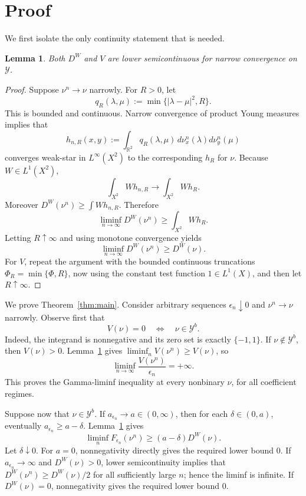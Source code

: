 \documentclass[11pt]{article}
\newtheorem{lemma}{Lemma}
\newcommand{\Y}{\mathcal{Y}}
\begin{document}
\section{Proof}

We first isolate the only continuity statement that is needed.

\begin{lemma}\label{lem:lsc}
Both \(D^W\) and \(V\) are lower semicontinuous for narrow convergence on \(\Y\).
\end{lemma}

\begin{proof}
Suppose \(\nu^n\to\nu\) narrowly. For \(R>0\), let
\[
q_R(\lambda,\mu):=\min\{|\lambda-\mu|^2,R\}.
\]
This is bounded and continuous. Narrow convergence of product Young measures \cite[Lemma~8]{BCD} implies that
\[
h_{n,R}(x,y):=\int_{\mathbb R^2}q_R(\lambda,\mu)
\,d\nu^n_x(\lambda)d\nu^n_y(\mu)
\]
converges weak-star in \(L^\infty(X^2)\) to the corresponding \(h_R\) for \(\nu\). Because \(W\in L^1(X^2)\),
\[
\int_{X^2}Wh_{n,R}\longrightarrow\int_{X^2}Wh_R.
\]
Moreover \(D^W(\nu^n)\geq\int Wh_{n,R}\). Therefore
\[
\liminf_{n\to\infty}D^W(\nu^n)\geq\int_{X^2}Wh_R.
\]
Letting \(R\uparrow\infty\) and using monotone convergence yields
\[
\liminf_{n\to\infty}D^W(\nu^n)\geq D^W(\nu).
\]
For \(V\), repeat the argument with the bounded continuous truncations
\(\Phi_R=\min\{\Phi,R\}\), now using the constant test function \(1\in L^1(X)\), and then let \(R\uparrow\infty\).
\end{proof}

We prove Theorem~\ref{thm:main}. Consider arbitrary sequences \(\epsilon_n\downarrow0\) and \(\nu^n\to\nu\) narrowly. Observe first that
\[
V(\nu)=0\quad\Longleftrightarrow\quad\nu\in\Y^b.
\]
Indeed, the integrand is nonnegative and its zero set is exactly \(\{-1,1\}\). If \(\nu\notin\Y^b\), then \(V(\nu)>0\). Lemma~\ref{lem:lsc} gives \(\liminf_nV(\nu^n)\geq V(\nu)\), so
\[
\liminf_{n\to\infty}\frac{V(\nu^n)}{\epsilon_n}=+\infty.
\]
This proves the Gamma-liminf inequality at every nonbinary \(\nu\), for all coefficient regimes.

Suppose now that \(\nu\in\Y^b\). If \(a_{\epsilon_n}\to a\in(0,\infty)\), then for each \(\delta\in(0,a)\), eventually \(a_{\epsilon_n}\geq a-\delta\). Lemma~\ref{lem:lsc} gives
\[
\liminf_nF_{\epsilon_n}(\nu^n)
\geq(a-\delta)D^W(\nu).
\]
Let \(\delta\downarrow0\). For \(a=0\), nonnegativity directly gives the required lower bound \(0\). If \(a_{\epsilon_n}\to\infty\) and \(D^W(\nu)>0\), lower semicontinuity implies that \(D^W(\nu^n)\geq D^W(\nu)/2\) for all sufficiently large \(n\); hence the liminf is infinite. If \(D^W(\nu)=0\), nonnegativity gives the required lower bound \(0\).
\end{document}
